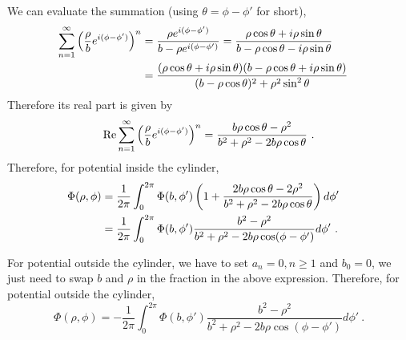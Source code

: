 \documentclass[12pt]{article}
\begin{document}
We can evaluate the summation (using $\theta = \phi - \phi'$ for short),
\begin{align}
    \sum_{n=1}^\infty \left(\frac{\rho}{b} e^{i(\phi - \phi')}\right)^n &= \frac{\rho e^{i(\phi - \phi')}}{b - \rho e^{i(\phi - \phi')}} = \frac{\rho \cos \theta + i \rho \sin\theta}{b - \rho \cos\theta - i \rho \sin \theta}\cr
    & = \frac{(\rho \cos \theta + i \rho \sin \theta) (b - \rho \cos \theta + i \rho \sin \theta)}{(b-\rho\cos\theta)^2 + \rho^2 \sin^2\theta}
\end{align}
Therefore its real part is given by
\begin{equation}
    {\rm Re} \sum_{n=1}^\infty \left(\frac{\rho}{b} e^{i(\phi - \phi')}\right)^n = \frac{b \rho \cos \theta - \rho^2}{b^2 + \rho^2 - 2b\rho \cos\theta}~.
\end{equation}
Therefore, for potential inside the cylinder,
\begin{align}
    \Phi(\rho, \phi) &= \frac{1}{2\pi} \int_0^{2\pi} \Phi(b, \phi')\left(1 + \frac{2 b\rho \cos \theta - 2\rho^2}{b^2 + \rho^2 - 2 b\rho \cos\theta}\right)d\phi'\cr
    &= \frac{1}{2\pi} \int_0^{2\pi} \Phi(b, \phi') \frac{b^2 - \rho^2}{b^2 + \rho^2 - 2b\rho \cos(\phi - \phi')} d\phi'~.
\end{align}

For potential outside the cylinder, we have to set $a_n = 0, n\ge 1$ and $b_0 = 0$, we just need to swap $b$ and $\rho$ in the fraction in the above expression. Therefore, for potential outside the cylinder,
\begin{equation}
    \Phi(\rho, \phi) = -\frac{1}{2\pi} \int_0^{2\pi} \Phi(b, \phi') \frac{b^2 - \rho^2}{b^2 + \rho^2 - 2b\rho \cos(\phi - \phi')} d\phi'~.
\end{equation}

\newpage
\end{document}
